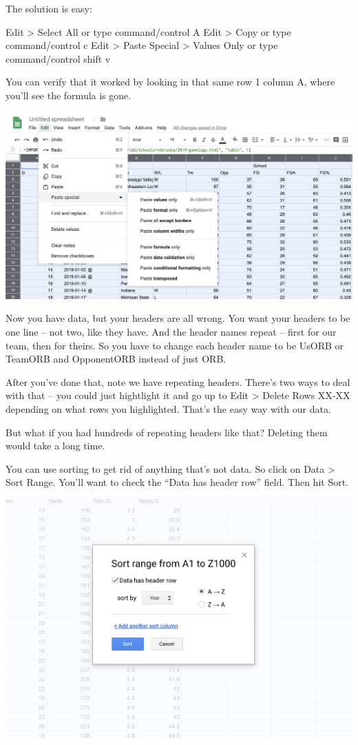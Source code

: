 \documentclass[]{book}
\begin{document}
The solution is easy:

Edit \textgreater{} Select All or type command/control A Edit
\textgreater{} Copy or type command/control c Edit \textgreater{} Paste
Special \textgreater{} Values Only or type command/control shift v

You can verify that it worked by looking in that same row 1 column A,
where you'll see the formula is gone.

\includegraphics[width=36.81in]{images/clean2}

Now you have data, but your headers are all wrong. You want your headers
to be one line -- not two, like they have. And the header names repeat
-- first for our team, then for theirs. So you have to change each
header name to be UsORB or TeamORB and OpponentORB instead of just ORB.

After you've done that, note we have repeating headers. There's two ways
to deal with that -- you could just hightlight it and go up to Edit
\textgreater{} Delete Rows XX-XX depending on what rows you highlighted.
That's the easy way with our data.

But what if you had hundreds of repeating headers like that? Deleting
them would take a long time.

You can use sorting to get rid of anything that's not data. So click on
Data \textgreater{} Sort Range. You'll want to check the ``Data has
header row'' field. Then hit Sort.

\includegraphics[width=21.61in]{images/clean3}
\end{document}

